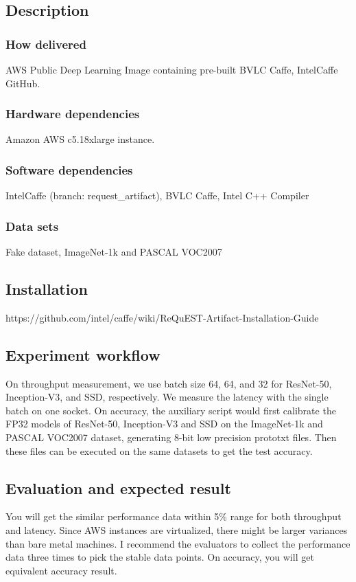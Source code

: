\documentclass[sigplan]{acmart}
\begin{document}
\subsection{Description}

\subsubsection{How delivered}
AWS Public Deep Learning Image containing pre-built BVLC Caffe, IntelCaffe GitHub.
\subsubsection{Hardware dependencies}
Amazon AWS c5.18xlarge instance.
\subsubsection{Software dependencies}
IntelCaffe (branch: request\_artifact), BVLC Caffe, Intel\textsuperscript{\textregistered} C++ Compiler
\subsubsection{Data sets}
Fake dataset, ImageNet-1k and PASCAL VOC2007
\subsection{Installation}
https://github.com/intel/caffe/wiki/ReQuEST-Artifact-Installation-Guide

\subsection{Experiment workflow}
On throughput measurement, we use batch size 64, 64, and 32 for ResNet-50, Inception-V3, and SSD, respectively. We measure the latency with the single batch on one socket. On accuracy, the auxiliary script would first calibrate the FP32 models of ResNet-50, Inception-V3 and SSD on the ImageNet-1k and PASCAL VOC2007 dataset, generating 8-bit low precision prototxt files. Then these files can be executed on the same datasets to get the test accuracy.
\subsection{Evaluation and expected result}
You will get the similar performance data within 5\% range for both throughput and latency. Since AWS instances are virtualized, there might be larger variances than bare metal machines. I recommend the evaluators to collect the performance data three times to pick the stable data points. On accuracy, you will get equivalent accuracy result.
\end{document}
